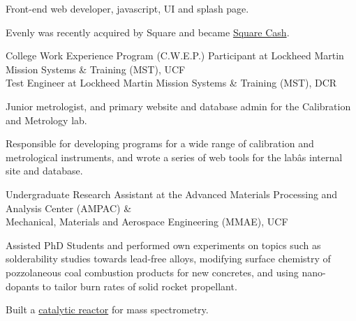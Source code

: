 \documentclass[]{deedy-resume-openfont} %
\begin{document}
\begin{minipage}[t]{0.65\textwidth}
\begin{tightemize}
\item Front-end web developer, javascript, UI and splash page.
\item Evenly was recently acquired by Square and became \href{https://square.com/cash}{Square Cash}.
\end{tightemize}
\sectionsep

College Work Experience Program (C.W.E.P.) Participant at Lockheed Martin Mission Systems \& Training (MST), UCF\\
Test Engineer at Lockheed Martin Mission Systems \& Training (MST), DCR\\
\begin{tightemize}
\item Junior  metrologist,  and  primary  website  and  database  admin  for  the Calibration and Metrology lab.
\item Responsible for developing programs for a wide range of calibration and metrological instruments, and wrote a series of web tools for the labâs internal site and database.
\end{tightemize}
\sectionsep

Undergraduate Research Assistant at the Advanced Materials Processing and Analysis Center (AMPAC) \&\\
Mechanical, Materials and Aerospace Engineering (MMAE), UCF\\
\begin{tightemize}
\item Assisted  PhD  Students  and  performed  own  experiments  on  topics  such  as solderability studies towards lead-free alloys, modifying surface chemistry of pozzolaneous coal combustion products for new concretes, and using nano-dopants to tailor burn rates of solid rocket propellant.
\item Built a \href{http://sudipta-seal.ucf.edu/images/photos/characterization/Catalytic-Reactor.jpg}{catalytic reactor} for mass spectrometry.
\end{tightemize}


\end{minipage}
\end{document}
